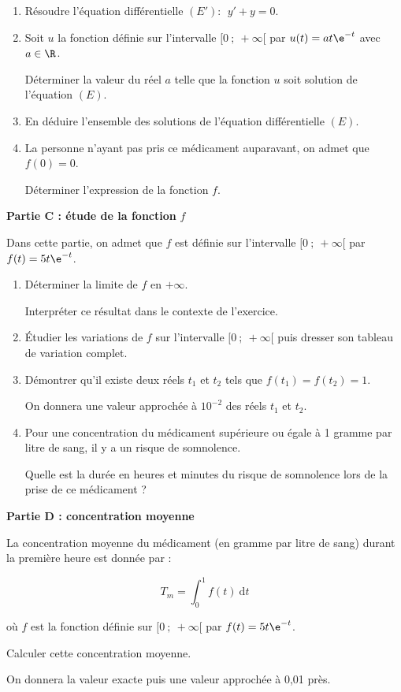 \medskip

\begin{enumerate}
\item Résoudre l'équation différentielle $(E') : \:\: y' + y = 0$.
\item Soit $u$ la fonction définie sur l’intervalle $[0~;~ +\infty[$ par $u(t) = at\e^{-t}$ avec $a \in \R$.

Déterminer la valeur du réel $a$ telle que la fonction $u$ soit solution de l'équation $(E)$.
\item En déduire l'ensemble des solutions de l'équation différentielle $(E)$.
\item La personne n'ayant pas pris ce médicament auparavant, on admet que $f(0) = 0$.

Déterminer l'expression de la fonction $f$.
\end{enumerate}

\medskip

\textbf{Partie C : étude de la fonction} \boldmath $f$ \unboldmath

\medskip

Dans cette partie, on admet que $f$ est définie sur l'intervalle $[0~;~+\infty[$ par $f(t) = 5t \e^{-t}$.

\medskip

\begin{enumerate}
\item Déterminer la limite de $f$ en $+\infty$.

Interpréter ce résultat dans le contexte de l'exercice.
\item Étudier les variations de $f$ sur l'intervalle $[0~;~ +\infty[$ puis dresser son tableau de variation complet.
\item Démontrer qu’il existe deux réels $t_1$ et $t_2$ tels que $f\left(t_1\right) = f\left(t_2\right) = 1$.

On donnera une valeur approchée à $10^{-2}$ des réels $t_1$ et $t_2$.
\item Pour une concentration du médicament supérieure ou égale à 1 gramme par litre de sang, il y a un risque de somnolence.

Quelle est la durée en heures et minutes du risque de somnolence lors de la prise de ce médicament ?
\end{enumerate}

\medskip

\textbf{Partie D : concentration moyenne}

\medskip

La concentration moyenne du médicament (en gramme par litre de sang) durant la première heure est donnée par :

\[T_m = \displaystyle\int_0^1 f(t) \:\text{d}t\]

où $f$ est la fonction définie sur $[0~;~+\infty[$ par $f(t) = 5t\e^{-t}$.

Calculer cette concentration moyenne.

On donnera la valeur exacte puis une valeur approchée à 0,01 près.

\bigskip
